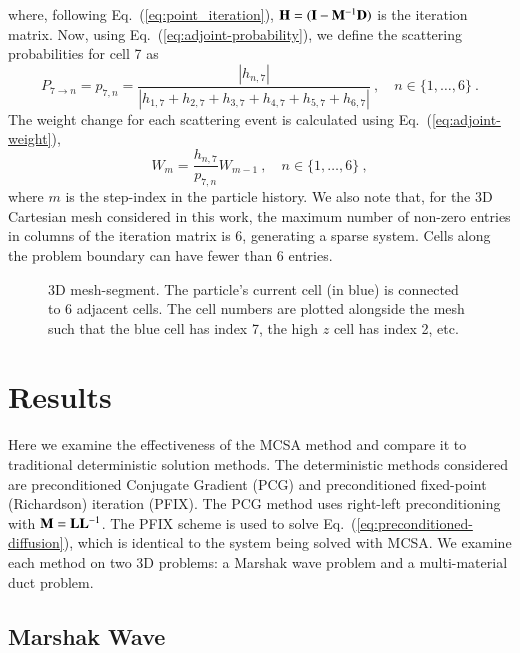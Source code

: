 \documentclass[preprint,12pt]{elsarticle}
\newcommand{\vI}{\ensuremath{\ve{I}}}
\begin{document}
where, following Eq.~(\ref{eq:point_iteration}), $\ve{H} = (\vI -
\ve{M}^{-1}\ve{D})$ is the iteration matrix.  Now, using
Eq.~(\ref{eq:adjoint-probability}), we define the scattering probabilities for
cell 7 as
\begin{equation*}
  P_{7\rightarrow n} = p_{7,n} = \frac{|h_{n,7}|}{|h_{1,7} + h_{2,7} +
    h_{3,7} + h_{4,7} + h_{5,7} + h_{6,7}|}\:,\quad n\in
  \{1,\ldots,6\}\:.
\end{equation*}
The weight change for each scattering event is calculated using
Eq.~(\ref{eq:adjoint-weight}),
\begin{equation*}
  W_{m} = \frac{h_{n,7}}{p_{7,n}}W_{m-1}\:,\quad n\in
  \{1,\ldots,6\}\:,
\end{equation*}
where $m$ is the step-index in the particle history.  We also note that, for
the 3D Cartesian mesh considered in this work, the maximum number of non-zero
entries in columns of the iteration matrix is 6, generating a sparse system.
Cells along the problem boundary can have fewer than 6 entries.
\begin{figure}[h!]
  \centerline{ }
  \caption{3D mesh-segment.  The particle's current cell (in blue) is
    connected to 6 adjacent cells.  The cell numbers are plotted
    alongside the mesh such that the blue cell has index 7, the high
    $z$ cell has index 2, etc.}
  \label{fig:mesh_segment}
\end{figure}

\section{Results}
\label{sec:results}

Here we examine the effectiveness of the MCSA method and compare it to
traditional deterministic solution methods.  The deterministic methods
considered are preconditioned Conjugate Gradient (PCG) and preconditioned
fixed-point (Richardson) iteration (PFIX).  The PCG method uses right-left
preconditioning with $\mathbf{M}=\mathbf{L}\mathbf{L}^{-1}$.  The PFIX scheme is used to
solve Eq.~(\ref{eq:preconditioned-diffusion}), which is identical to the
system being solved with MCSA.  We examine each method on two 3D problems: a
Marshak wave problem and a multi-material duct problem.

\subsection{Marshak Wave}
\end{document}
